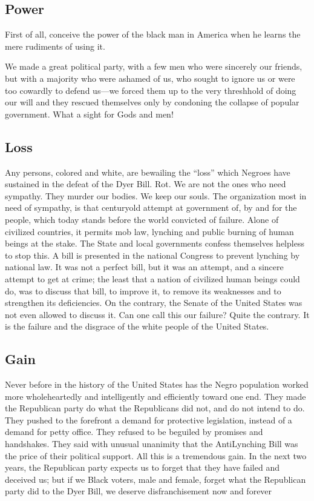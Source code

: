 \documentclass[letterpaper,10pt,english]{jupyterBook}
\begin{document}
\subsection{Power}
\label{\detokenize{Volumes/24/03/intentions:power}}
\sphinxAtStartPar
First of all, conceive the power of the black man in America when he learns the mere rudiments of using it.

\sphinxAtStartPar
We made a great political party, with a few men who were sincerely our friends, but with a majority who were ashamed of us, who sought to ignore us or were too cowardly to defend us—we forced them up to the very threshhold of doing our will and they rescued themselves only by condoning the collapse of popular government. What a sight for Gods and men!


\subsection{Loss}
\label{\detokenize{Volumes/24/03/intentions:loss}}
\sphinxAtStartPar
Any persons, colored and white, are bewailing the “loss” which Negroes have sustained in the defeat of the Dyer Bill. Rot. We are not the ones who need sympathy. They murder our bodies. We keep our souls. The organization most in need of sympathy, is that century\sphinxhyphen{}old attempt at government of, by and for the people, which today stands before the world convicted of failure. Alone of civilized countries, it permits mob law, lynching and public burning of human beings at the stake. The State and local governments confess themselves helpless to stop this. A bill is presented in the national Congress to prevent lynching by national law. It was not a perfect bill, but it was an attempt, and a sincere attempt to get at crime; the least that a nation of civilized human beings could do, was to discuss that bill, to improve it, to remove its weaknesses and to strengthen its deficiencies. On the contrary, the Senate of the United States was not even allowed to discuss it. Can one call this our failure? Quite the contrary. It is the failure and the disgrace of the white people of the United States.


\subsection{Gain}
\label{\detokenize{Volumes/24/03/intentions:gain}}
\sphinxAtStartPar
Never before in the history of the United States has the Negro population worked more wholeheartedly and intelligently and efficiently toward one end. They made the Republican party do what the Republicans did not, and do not intend to do. They pushed to the forefront a demand for protective legislation, instead of a demand for petty office. They refused to be beguiled by promises and hand\sphinxhyphen{}shakes. They said with unusual unanimity that the Anti\sphinxhyphen{}Lynching Bill was the price of their political support. All this is a tremendous gain. In the next two years, the Republican party expects us to forget that they have failed and deceived us; but if we Black voters, male and female, forget what the Republican party did to the Dyer Bill, we deserve disfranchisement now and forever
\end{document}
